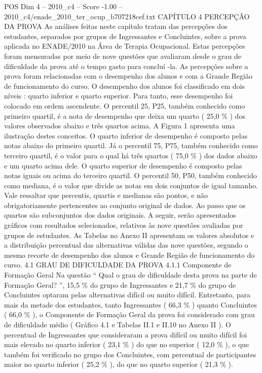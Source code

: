 \begin{textsample}{POS Dim 4 – 2010\_c4 – Score -1.00 – 2010\_c4/enade\_2010\_ter\_ocup\_b707218cef.txt}  \label{ex:f4_pos_294}
CAPÍTULO 4 PERCEPÇÃO DA PROVA As análises feitas neste capítulo tratam das percepções dos estudantes, separados por grupos de Ingressantes e Concluintes, sobre a prova aplicada no ENADE/2010 na Área de Terapia Ocupacional.
Estas percepções foram mensuradas por meio de nove questões que avaliaram desde o grau de dificuldade da prova até o tempo gasto para concluí -la.
As percepções sobre a prova foram relacionadas com o desempenho dos alunos e com a Grande Região de funcionamento do curso.
O desempenho dos alunos foi classificado em dois níveis : quarto inferior e quarto superior.
Para tanto, esse desempenho foi colocado em ordem ascendente.
O percentil 25, P25, também conhecido como primeiro quartil, é a nota de desempenho que deixa um quarto ( 25,0 \% ) dos valores observados abaixo e três quartos acima.
A Figura 1 apresenta uma ilustração destes conceitos.
O quarto inferior de desempenho é composto pelas notas abaixo do primeiro quartil.
Já o percentil 75, P75, também conhecido como terceiro quartil, é o valor para o qual há três quartos ( 75,0 \% ) dos dados abaixo e um quarto acima dele.
O quarto superior de desempenho é composto pelas notas iguais ou acima do terceiro quartil.
O percentil 50, P50, também conhecido como mediana, é o valor que divide as notas em dois conjuntos de igual tamanho.
Vale ressaltar que percentis, quartis e medianas são pontos, e não obrigatoriamente pertencentes ao conjunto original de dados.
Ao passo que os quartos são subconjuntos dos dados originais.
A seguir, serão apresentados gráficos com resultados selecionados, relativos às nove questões avaliadas por grupos de estudantes.
As Tabelas no Anexo II apresentam os valores absolutos e a distribuição percentual das alternativas válidas das nove questões, segundo o mesmo recorte de desempenho dos alunos e Grande Região de funcionamento do curso. 4.1 GRAU DE DIFICULDADE DA PROVA 4.1.1 Componente de Formação Geral Na questão “ Qual o grau de dificuldade desta prova na parte de Formação Geral? ”, 15,5 \% do grupo de Ingressantes e 21,7 \% do grupo de Concluintes optaram pelas alternativas difícil ou muito difícil.
Entretanto, para mais da metade dos estudantes, tanto Ingressantes ( 66,3 \% ) quanto Concluintes ( 66,0 \% ), o Componente de Formação Geral da prova foi considerado com grau de dificuldade médio ( Gráfico 4.1 e Tabelas II.1 e II.10 no Anexo II ).
O percentual de Ingressantes que consideraram a prova difícil ou muito difícil foi mais elevado no quarto inferior ( 23,1 \% ) do que no superior ( 12,0 \% ), o que também foi verificado no grupo dos Concluintes, com percentual de participantes maior no quarto inferior ( 25,2 \% ), do que no quarto superior ( 21,3 \% ).

\end{textsample}
